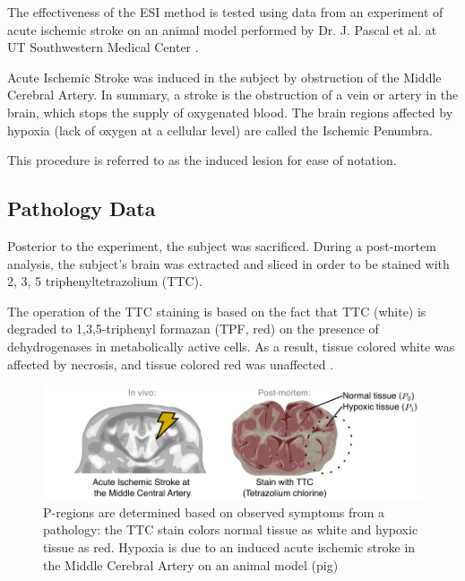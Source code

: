 The effectiveness of the ESI method is tested using data from an experiment of acute ischemic stroke on an animal model performed by Dr. J. Pascal et al. at UT Southwestern Medical Center \cite{pig_lesion1, PMID_36109613}.

Acute Ischemic Stroke was induced in the subject by obstruction of the Middle Cerebral Artery.
%
In summary, a stroke is the obstruction of a vein or artery in the brain, which stops the supply of oxygenated blood.
%
The brain regions affected by hypoxia (lack of oxygen at a cellular level) are called the Ischemic Penumbra.

This procedure is referred to as the induced lesion for ease of notation.

\subsection{Pathology Data}

Posterior to the experiment, the subject was sacrificed.
%
During a post-mortem analysis, the subject's brain was extracted and sliced in order to be stained with 
2, 3, 5 triphenyltetrazolium (TTC).

The operation of the TTC staining is based on the fact that TTC (white) 
is degraded to 1,3,5-triphenyl formazan (TPF, red)
on the presence of dehydrogenases in metabolically active cells.
%
As a result, tissue colored white was affected by necrosis, and tissue colored red was unaffected \cite{li2018use}. 

\begin{figure}
\centering
\includegraphics[width=\linewidth]{./img/Pregions_real.pdf}
\caption{P-regions are determined based on observed symptoms from a pathology: the TTC stain colors normal tissue as white and hypoxic tissue as red.
%
Hypoxia is due to an induced acute ischemic stroke in the Middle Cerebral Artery on an animal model (pig)
%
}
\label{fig:Preg_real}
\end{figure}

